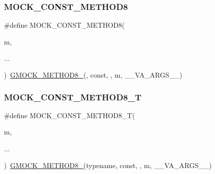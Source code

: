 \mbox{\label{_obj__test_2lib_2googletest-release-1_88_81_2googlemock_2include_2gmock_2gmock-generated-function-mockers_8h_a614ee58b7c9ab72e90c850d4bb97a502}} 
\subsubsection{\texorpdfstring{MOCK\_CONST\_METHOD8}{MOCK\_CONST\_METHOD8}}
{\footnotesize\ttfamily \#define M\+O\+C\+K\+\_\+\+C\+O\+N\+S\+T\+\_\+\+M\+E\+T\+H\+O\+D8(\begin{DoxyParamCaption}\item[{}]{m,  }\item[{}]{... }\end{DoxyParamCaption})~\mbox{\hyperlink{_obj__test_2lib_2googletest-release-1_88_81_2googlemock_2include_2gmock_2gmock-generated-function-mockers_8h_aa84a36427c44505207b7cad5dec7ad67}{G\+M\+O\+C\+K\+\_\+\+M\+E\+T\+H\+O\+D8\+\_\+}}(, const, , m, \+\_\+\+\_\+\+V\+A\+\_\+\+A\+R\+G\+S\+\_\+\+\_\+)}

\mbox{\label{_obj__test_2lib_2googletest-release-1_88_81_2googlemock_2include_2gmock_2gmock-generated-function-mockers_8h_a430c2eae077074190d4b380868d42944}} 
\subsubsection{\texorpdfstring{MOCK\_CONST\_METHOD8\_T}{MOCK\_CONST\_METHOD8\_T}}
{\footnotesize\ttfamily \#define M\+O\+C\+K\+\_\+\+C\+O\+N\+S\+T\+\_\+\+M\+E\+T\+H\+O\+D8\+\_\+T(\begin{DoxyParamCaption}\item[{}]{m,  }\item[{}]{... }\end{DoxyParamCaption})~\mbox{\hyperlink{_obj__test_2lib_2googletest-release-1_88_81_2googlemock_2include_2gmock_2gmock-generated-function-mockers_8h_aa84a36427c44505207b7cad5dec7ad67}{G\+M\+O\+C\+K\+\_\+\+M\+E\+T\+H\+O\+D8\+\_\+}}(typename, const, , m, \+\_\+\+\_\+\+V\+A\+\_\+\+A\+R\+G\+S\+\_\+\+\_\+)}

